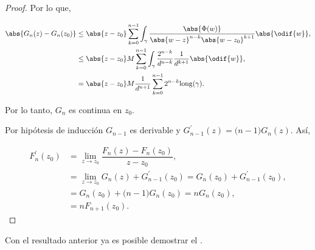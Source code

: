 \documentclass[../main.tex]{subfiles}
\begin{document}
\begin{proof}
    Por lo que,

    \begin{align*}
        \abs{G_{n}(z) - G_{n}(z_{0})} &\leq \abs{z - z_{0}}\sum_{k = 0}^{n -
        1}\int_{\gamma}^{}\dfrac{\abs{\Phi(w)}}{\abs{w - z}^{n - k}\abs{w - z_{0}}^{k +
        1}}\abs{\odif{w}},\\
        &\leq \abs{z - z_{0}}M \sum_{k = 0}^{n -
        1}\int_{\gamma}^{}\dfrac{2^{n - k}}{d^{n -
        k}}\dfrac{1}{d^{k + 1}}\abs{\odif{w}},\\
        &= \abs{z - z_{0}}M \dfrac{1}{d^{n + 1}}\sum_{k = 0}^{n - 1}2^{n -
        k}\mathrm{long}(\gamma).
    \end{align*}

    Por lo tanto, \(G_{n}\) es continua en \(z_{0}\).

    Por hipótesis de inducción \(G_{n - 1}\) es derivable y
    \(G_{n-1}^{\prime}(z) = \bigl(n
    - 1\bigr)G_{n}(z)\). Así,

    \begin{align*}
        F_{n}^{\prime}(z_{0}) &= \lim_{z \to z_{0}} \dfrac{F_{n}(z) - F_{n}(z_{0})}{z -
        z_{0}},\\
        &= \lim_{z \to z_{0}} G_{n}(z) + G_{n - 1}^{\prime}(z_{0}) =
        G_{n}(z_{0}) + G_{n -
        1}^{\prime}(z_{0}),\\
        &= G_{n}(z_{0}) + \bigl(n - 1\bigr)G_{n}(z_{0}) = nG_{n}(z_{0}),\\
        &= n F_{n + 1}(z_{0}).
    \end{align*}
\end{proof}


Con el resultado anterior ya es posible demostrar el
.
\end{document}
